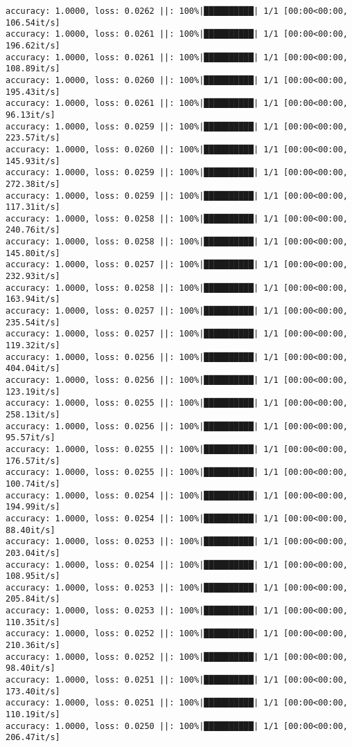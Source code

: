 \documentclass[
]{article}
\begin{document}
\begin{verbatim}
accuracy: 1.0000, loss: 0.0262 ||: 100%|██████████| 1/1 [00:00<00:00, 106.54it/s]
accuracy: 1.0000, loss: 0.0261 ||: 100%|██████████| 1/1 [00:00<00:00, 196.62it/s]
accuracy: 1.0000, loss: 0.0261 ||: 100%|██████████| 1/1 [00:00<00:00, 108.89it/s]
accuracy: 1.0000, loss: 0.0260 ||: 100%|██████████| 1/1 [00:00<00:00, 195.43it/s]
accuracy: 1.0000, loss: 0.0261 ||: 100%|██████████| 1/1 [00:00<00:00, 96.13it/s]
accuracy: 1.0000, loss: 0.0259 ||: 100%|██████████| 1/1 [00:00<00:00, 223.57it/s]
accuracy: 1.0000, loss: 0.0260 ||: 100%|██████████| 1/1 [00:00<00:00, 145.93it/s]
accuracy: 1.0000, loss: 0.0259 ||: 100%|██████████| 1/1 [00:00<00:00, 272.38it/s]
accuracy: 1.0000, loss: 0.0259 ||: 100%|██████████| 1/1 [00:00<00:00, 117.31it/s]
accuracy: 1.0000, loss: 0.0258 ||: 100%|██████████| 1/1 [00:00<00:00, 240.76it/s]
accuracy: 1.0000, loss: 0.0258 ||: 100%|██████████| 1/1 [00:00<00:00, 145.80it/s]
accuracy: 1.0000, loss: 0.0257 ||: 100%|██████████| 1/1 [00:00<00:00, 232.93it/s]
accuracy: 1.0000, loss: 0.0258 ||: 100%|██████████| 1/1 [00:00<00:00, 163.94it/s]
accuracy: 1.0000, loss: 0.0257 ||: 100%|██████████| 1/1 [00:00<00:00, 235.54it/s]
accuracy: 1.0000, loss: 0.0257 ||: 100%|██████████| 1/1 [00:00<00:00, 119.32it/s]
accuracy: 1.0000, loss: 0.0256 ||: 100%|██████████| 1/1 [00:00<00:00, 404.04it/s]
accuracy: 1.0000, loss: 0.0256 ||: 100%|██████████| 1/1 [00:00<00:00, 123.19it/s]
accuracy: 1.0000, loss: 0.0255 ||: 100%|██████████| 1/1 [00:00<00:00, 258.13it/s]
accuracy: 1.0000, loss: 0.0256 ||: 100%|██████████| 1/1 [00:00<00:00, 95.57it/s]
accuracy: 1.0000, loss: 0.0255 ||: 100%|██████████| 1/1 [00:00<00:00, 176.57it/s]
accuracy: 1.0000, loss: 0.0255 ||: 100%|██████████| 1/1 [00:00<00:00, 100.74it/s]
accuracy: 1.0000, loss: 0.0254 ||: 100%|██████████| 1/1 [00:00<00:00, 194.99it/s]
accuracy: 1.0000, loss: 0.0254 ||: 100%|██████████| 1/1 [00:00<00:00, 88.40it/s]
accuracy: 1.0000, loss: 0.0253 ||: 100%|██████████| 1/1 [00:00<00:00, 203.04it/s]
accuracy: 1.0000, loss: 0.0254 ||: 100%|██████████| 1/1 [00:00<00:00, 108.95it/s]
accuracy: 1.0000, loss: 0.0253 ||: 100%|██████████| 1/1 [00:00<00:00, 205.84it/s]
accuracy: 1.0000, loss: 0.0253 ||: 100%|██████████| 1/1 [00:00<00:00, 110.35it/s]
accuracy: 1.0000, loss: 0.0252 ||: 100%|██████████| 1/1 [00:00<00:00, 210.36it/s]
accuracy: 1.0000, loss: 0.0252 ||: 100%|██████████| 1/1 [00:00<00:00, 98.40it/s]
accuracy: 1.0000, loss: 0.0251 ||: 100%|██████████| 1/1 [00:00<00:00, 173.40it/s]
accuracy: 1.0000, loss: 0.0251 ||: 100%|██████████| 1/1 [00:00<00:00, 110.19it/s]
accuracy: 1.0000, loss: 0.0250 ||: 100%|██████████| 1/1 [00:00<00:00, 206.47it/s]

\end{verbatim}
\end{document}
